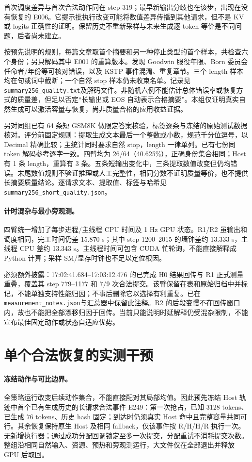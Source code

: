 \documentclass[UTF8,fontset=fandol,a4paper,10pt]{ctexart}
\newcommand{\code}[1]{\nolinkurl{#1}}
\begin{document}
首次调度差异与首次合法动作同在 step 319；最早新输出分歧也在该步，出现在没有恢复的 E006。它提示批执行改变可能将数值差异传播到其他请求，但不是 KV 或 logits 正确性的证明。保留历史不重新采样与未来生成逐 token 等价是不同问题，后者尚未建立。

按预先说明的规则，每篇文章取首个摘要和另一种停止类型的首个样本，共检查六个身份；另只解码其中 E001 的重算版本。发现 Goodwin 服役年限、Born 委员会任命者/年份等可核对错误，以及 KSTP 事件混淆、重复章节。三个 length 样本均在句或词中截断；一个自然 stop 样本仍未收束名单。记录见\code{summary256_quality.txt}及解码文件。非随机六例不能估计总体错误率或恢复方式的质量差，但足以否定“长输出或 EOS 自动表示合格摘要”。本组仅证明真实自然生成可以激活容量与恢复，尚非质量合格的应用收益证据。

另对同组已有 64 条短 GSM8K 做限定答案核验，标签逐条与冻结的原始测试数据核对。评分前固定规则：提取生成文本最后一个整数或小数，规范千分位逗号，以 Decimal 精确比较；主统计同时要求自然 stop，length 一律单列。已有七份同 token 解码参考逐字一致。四臂均为 26/64（40.625\%），正确身份集合相同；Host 有 1 条 length，重算有 3 条。五条短输出变化中，三条提取数值改变但仍均错误。末尾数值规则不验证推理或人工完整性，相同分数不证明质量等价，也不提供长摘要质量结论。逐请求文本、提取值、标签与哈希见\code{summary256_short_quality.json}。

\paragraph{计时混杂与最小旁观测。}
四臂统一增加了每步进程/主线程 CPU 时间及 1 Hz GPU 状态。R1/R2 虽输出和调度相同，完工时间仍差 15.870 s；其中 step 1200--2015 的墙钟差约 13.333 s，主线程 CPU 差约 13.343 s。主线程时间可包含 CUDA 忙轮询，不能直接解释成 Python 计算；采样 SM/显存时钟也不足以定位根因。

必须额外披露：17:02:41.684--17:03:12.476 的已完成 H0 结果回传与 R1 正式测量重叠，覆盖其 step 779--1177 和 7/9 次合法提交。该臂保留在表和原始归档中并标记，不能单独支持性能归因；不事后删除它以选择有利重复。已在\code{measurement_notes.json}与汇总器中保留此注释。R2 的后段变慢不在回传窗口内，故也不能把全部漂移归因于回传。当前只能说明时延解释仍受混杂限制，不能宣布最佳固定动作或状态自适应优势。

\section{单个合法恢复的实测干预}
\paragraph{冻结动作与可比边界。}
全策略运行改变后续动作集合，不能直接配对其局部均值。因此预先冻结 Host 轨迹中首个已有生成历史的长请求合法事件 E249：第一次抢占，已知 3128 tokens、已生成 76 tokens、历史 hash 固定；到达时仍须真实 Host 命中且完整容量共同可行。其余恢复保持原生 Host 及相同 fallback，仅该事件按 R/H/H/R 执行一次。无新增执行器；通过成功分配回调锁定至多一次提交，分配重试不消耗提交次数。整组沿相同自然输入、资源、预热和旁观测运行，大文件仅在全部退出并释放 GPU 后取回。
\end{document}

